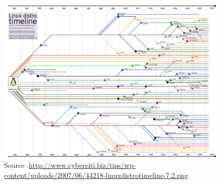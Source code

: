 \documentclass[11pt]{article} %
\begin{document}
        \begin{figure}
   \centering
\includegraphics[scale=0.2]{linuxdistrotimeline.png}
\caption{{\tiny Source :\url{http://www.cyberciti.biz/tips/wp-content/uploads/2007/06/44218-linuxdistrotimeline-7.2.png}}}
      \end{figure}






\newpage
\end{document}
